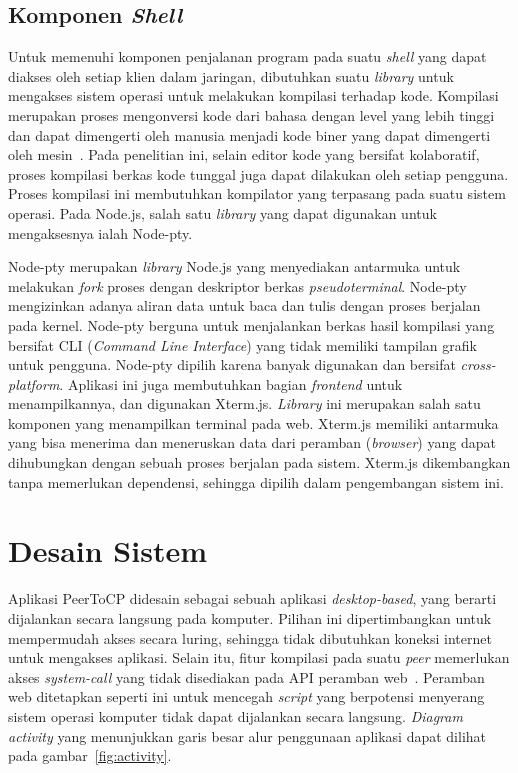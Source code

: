 \subsection{Komponen \textit{Shell}}

Untuk memenuhi komponen penjalanan program pada suatu \textit{shell} yang dapat diakses oleh setiap klien dalam jaringan, dibutuhkan suatu \textit{library} untuk mengakses sistem operasi untuk melakukan kompilasi terhadap kode. Kompilasi merupakan proses mengonversi kode dari bahasa dengan level yang lebih tinggi dan dapat dimengerti oleh manusia menjadi kode biner yang dapat dimengerti oleh mesin~\citep{aho1985compilers}. Pada penelitian ini, selain editor kode yang bersifat kolaboratif, proses kompilasi berkas kode tunggal juga dapat dilakukan oleh setiap pengguna. Proses kompilasi ini membutuhkan kompilator yang terpasang pada suatu sistem operasi. Pada Node.js, salah satu \textit{library} yang dapat digunakan untuk mengaksesnya ialah Node-pty.

Node-pty merupakan \textit{library} Node.js yang menyediakan antarmuka untuk melakukan \textit{fork} proses dengan deskriptor berkas \textit{pseudoterminal}. Node-pty mengizinkan adanya aliran data untuk baca dan tulis dengan proses berjalan pada kernel. Node-pty berguna untuk menjalankan berkas hasil kompilasi yang bersifat CLI (\textit{Command Line Interface}) yang tidak memiliki tampilan grafik untuk pengguna. Node-pty dipilih karena banyak digunakan dan bersifat \textit{cross-platform}. Aplikasi ini juga membutuhkan bagian \textit{frontend} untuk menampilkannya, dan digunakan Xterm.js. \textit{Library} ini merupakan salah satu komponen yang menampilkan terminal pada web. Xterm.js memiliki antarmuka yang bisa menerima dan meneruskan data dari peramban (\textit{browser}) yang dapat dihubungkan dengan sebuah proses berjalan pada sistem. Xterm.js dikembangkan tanpa memerlukan dependensi, sehingga dipilih dalam pengembangan sistem ini.

\section{Desain Sistem}

Aplikasi PeerToCP didesain sebagai sebuah aplikasi \textit{desktop-based}, yang berarti dijalankan secara langsung pada komputer. Pilihan ini dipertimbangkan untuk mempermudah akses secara luring, sehingga tidak dibutuhkan koneksi internet untuk mengakses aplikasi. Selain itu, fitur kompilasi pada suatu \textit{peer} memerlukan akses \textit{system-call} yang tidak disediakan pada API peramban web~\citep{v8, spidermonkey}. Peramban web ditetapkan seperti ini untuk mencegah \textit{script} yang berpotensi menyerang sistem operasi komputer tidak dapat dijalankan secara langsung. \textit{Diagram activity} yang menunjukkan garis besar alur penggunaan aplikasi dapat dilihat pada gambar~\ref{fig:activity}.

